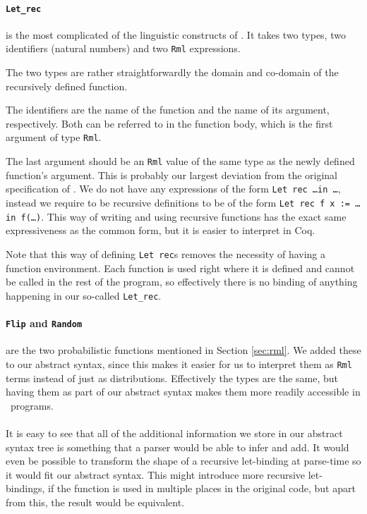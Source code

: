 \documentclass[11pt, leqno, titlepage]{article}
\def\coqe{\lstinline[language=Coq, basicstyle=\small]}
\theoremstyle{definition}
\begin{document}
\paragraph{\coqe{Let_rec}} is the most complicated of the linguistic constructs of
\rmlx. It takes two types, two identifiers (natural numbers) and two \coqe{Rml}
expressions.

The two types are rather straightforwardly the domain and co-domain of the
recursively defined function.

The identifiers are the name of the function and the name of its argument,
respectively. Both can be referred to in the function body, which is the first
argument of type \coqe{Rml}.

The last argument should be an \coqe{Rml} value of the same type as the newly defined
function's argument. This is probably our largest deviation from the original
specification of \rml. We do not have any expressions of the form \texttt{Let rec
  \dots in \dots}, instead we require to be recursive definitions to be of the form
\texttt{Let rec f x := \dots in f(\dots)}. This way of writing and using recursive
functions has the exact same expressiveness as the common form, but it is easier to
interpret in Coq.

Note that this way of defining \texttt{Let rec}s removes the necessity of having a
function environment. Each function is used right where it is defined and cannot be
called in the rest of the program, so effectively there is no binding of anything
happening in our so-called \coqe{Let_rec}. 

\paragraph{\coqe{Flip} and \coqe{Random}} are the two probabilistic functions
mentioned in Section \ref{sec:rml}. We added these to our abstract syntax, since this
makes it easier for us to interpret them as \coqe{Rml} terms instead of just as
distributions. Effectively the types are the same, but having them as part of our
abstract syntax makes them more readily accessible in \rmlx\ programs. \\
\\
It is easy to see that all of the additional information we store in our abstract
syntax tree is something that a parser would be able to infer and add. It would even
be possible to transform the shape of a recursive let-binding at parse-time so it
would fit our abstract syntax. This might introduce more recursive let-bindings, if
the function is used in multiple places in the original code, but apart from this,
the result would be equivalent. 
\end{document}

